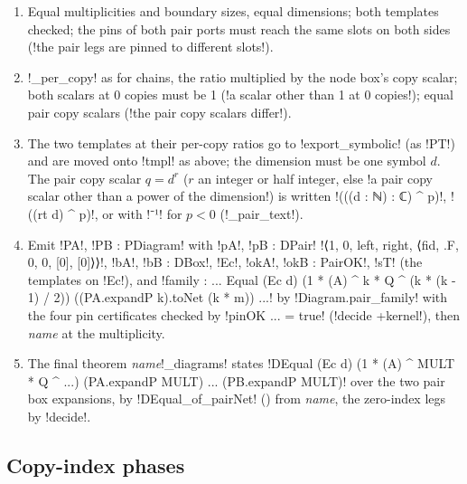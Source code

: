 {\begin{algorithm}\label{alg:lean-export-net-pairs}
\begin{enumerate}
\item Equal multiplicities and boundary sizes, equal dimensions; both templates checked; the
  pins of both pair ports must reach the same slots on both sides
  (\code!the pair legs are pinned to different slots!).
\item \py!_per_copy! as for chains, the ratio multiplied by the node box's copy scalar; both
  scalars at 0 copies must be 1 (\code!a scalar other than 1 at 0 copies!); equal pair copy
  scalars (\code!the pair copy scalars differ!).
\item The two templates at their per-copy ratios go to \py!export_symbolic! (as
  \code!PT!) and are moved onto \lean!tmpl! as above; the dimension must be one symbol $d$. The
  pair copy scalar $q = d^{r}$ ($r$ an integer or half integer, else
  \code!a pair copy scalar other than a power of the dimension!) is written
  \code!(((d : ℕ) : ℂ) ^ p)!, \code!((rt d) ^ p)!, or with \leanx!⁻¹! for $p<0$ (\py!_pair_text!).
\item Emit \code!PA!, \code!PB : PDiagram! with \code!pA!, \code!pB : DPair!
  \code!⟨1, 0, left, right, ⟨fid, .F, 0, 0, [0], [0]⟩⟩!, \code!bA!, \code!bB : DBox!, \code!Ec!,
  \code!okA!, \code!okB : PairOK!, \code!sT! (the templates on \code!Ec!), and
  \code!family : ... Equal (Ec d) (1 * (A) ^ k * Q ^ (k * (k - 1) / 2)) ((PA.expandP k).toNet (k * m)) ...!
  by \lean!Diagram.pair_family! with the four pin certificates checked by
  \code!pinOK ... = true! (\code!decide +kernel!), then \textit{name} at the multiplicity.
\item The final theorem \textit{name}\code!_diagrams! states
  \code!DEqual (Ec d) (1 * (A) ^ MULT * Q ^ ...) (PA.expandP MULT) ... (PB.expandP MULT)! over
  the two pair box expansions, by \lean!DEqual_of_pairNet! ()
  from \textit{name}, the zero-index legs by \code!decide!.
\end{enumerate}
\end{algorithm}

\subsection{Copy-index phases}\label{sec:lean-export-net-copyphase}

}
